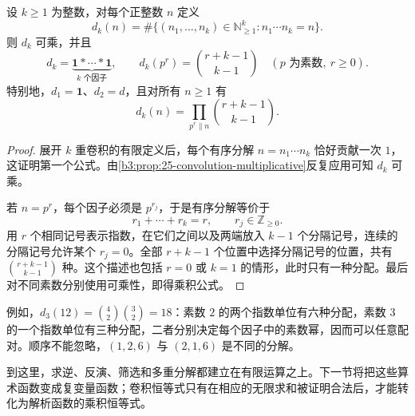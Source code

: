 \begin{proposition}[多重除数函数]
\label{b3:prop:25-higher-divisor}
设 \(k\ge1\) 为整数，对每个正整数 \(n\) 定义
\[
 d_k(n)=\#\{(n_1,\ldots,n_k)\in\mathbb N_{\ge1}^k:
                  n_1\cdots n_k=n\}.
\]
则 \(d_k\) 可乘，并且
\[
 d_k=\underbrace{\mathbf1*\cdots*\mathbf1}_{k\text{ 个因子}},
 \qquad d_k(p^r)=\binom{r+k-1}{k-1}
 \quad(p\text{ 为素数},\ r\ge0).
\]
特别地，\(d_1=\mathbf1\)、\(d_2=d\)，且对所有 \(n\ge1\) 有
\[
 d_k(n)=\prod_{p^r\parallel n}\binom{r+k-1}{k-1}.
\]
\end{proposition}
\begin{proof}
展开 \(k\) 重卷积的有限定义后，每个有序分解 \(n=n_1\cdots n_k\) 恰好贡献一次 \(1\)，这证明第一个公式。由\cref{b3:prop:25-convolution-multiplicative}反复应用可知 \(d_k\) 可乘。

若 \(n=p^r\)，每个因子必须是 \(p^{r_j}\)，于是有序分解等价于
\[
 r_1+\cdots+r_k=r,\qquad r_j\in\mathbb Z_{\ge0}.
\]
用 \(r\) 个相同记号表示指数，在它们之间以及两端放入 \(k-1\) 个分隔记号，连续的分隔记号允许某个 \(r_j=0\)。全部 \(r+k-1\) 个位置中选择分隔记号的位置，共有 \(\binom{r+k-1}{k-1}\) 种。这个描述也包括 \(r=0\) 或 \(k=1\) 的情形，此时只有一种分配。最后对不同素数分别使用可乘性，即得乘积公式。
\end{proof}

例如，\(d_3(12)=\binom{4}{2}\binom{3}{2}=18\)：素数 \(2\) 的两个指数单位有六种分配，素数 \(3\) 的一个指数单位有三种分配，二者分别决定每个因子中的素数幂，因而可以任意配对。顺序不能忽略，\((1,2,6)\) 与 \((2,1,6)\) 是不同的分解。

到这里，求逆、反演、筛选和多重分解都建立在有限运算之上。下一节将把这些算术函数变成复变量函数；卷积恒等式只有在相应的无限求和被证明合法后，才能转化为解析函数的乘积恒等式。